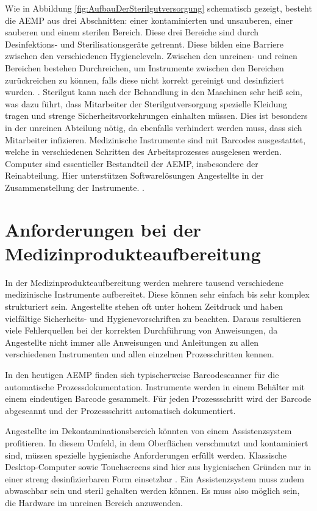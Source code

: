 Wie in Abbildung \ref{fig:AufbauDerSterilgutversorgung} schematisch gezeigt, besteht die AEMP aus drei Abschnitten: einer kontaminierten und unsauberen, einer sauberen und einem sterilen Bereich. Diese drei Bereiche sind durch Desinfektions- und Sterilisationsgeräte getrennt. Diese bilden eine Barriere zwischen den verschiedenen Hygieneleveln. Zwischen den unreinen- und reinen Bereichen bestehen Durchreichen, um Instrumente zwischen den Bereichen zurückreichen zu können, falls diese nicht korrekt gereinigt und desinfiziert wurden. \cite[S.~24]{Ruther2014}. Sterilgut kann nach der Behandlung in den Maschinen sehr heiß sein, was dazu führt, dass Mitarbeiter der Sterilgutversorgung spezielle Kleidung tragen und strenge Sicherheitsvorkehrungen einhalten müssen. Dies ist besonders in der unreinen Abteilung nötig, da ebenfalls verhindert werden muss, dass sich Mitarbeiter infizieren. Medizinische Instrumente sind mit Barcodes ausgestattet, welche in verschiedenen Schritten des Arbeitsprozesses ausgelesen werden. Computer sind essentieller Bestandteil der AEMP, insbesondere der Reinabteilung. Hier unterstützen Softwarelösungen Angestellte in der Zusammenstellung der Instrumente. \cite[S.~25]{Ruther2014}.
%
%
%
%
%
%
\section{Anforderungen bei der Medizinprodukteaufbereitung}
\label{sec:Anforderungen_bei_der_Medizinprodukteaufbereitung}
In der Medizinprodukteaufbereitung werden mehrere tausend verschiedene medizinische Instrumente aufbereitet. Diese können sehr einfach bis sehr komplex strukturiert sein. Angestellte stehen oft unter hohem Zeitdruck und haben  vielfältige Sicherheits- und Hygienevorschriften zu beachten. Daraus resultieren viele Fehlerquellen bei der korrekten Durchführung von Anweisungen, da Angestellte nicht immer alle Anweisungen und Anleitungen zu allen verschiedenen Instrumenten und allen einzelnen Prozesschritten kennen.

In den heutigen AEMP finden sich typischerweise Barcodescanner für die automatische Prozessdokumentation. Instrumente werden in einem Behälter mit einem eindeutigen Barcode gesammelt. Für jeden Prozessschritt wird der Barcode abgescannt und der Prozessschritt automatisch dokumentiert.

Angestellte im Dekontaminationsbereich könnten von einem Assistenzsystem profitieren. 
In diesem Umfeld, in dem Oberflächen verschmutzt und kontaminiert sind, müssen spezielle hygienische Anforderungen erfüllt werden. Klassische Desktop-Computer sowie Touchscreens sind hier aus hygienischen Gründen nur in einer streng desinfizierbaren Form einsetzbar \cite[S.~28]{Ruther2014}. Ein Assistenzsystem muss zudem abwaschbar sein und steril gehalten werden können. Es muss also möglich sein, die Hardware im unreinen Bereich anzuwenden. 

